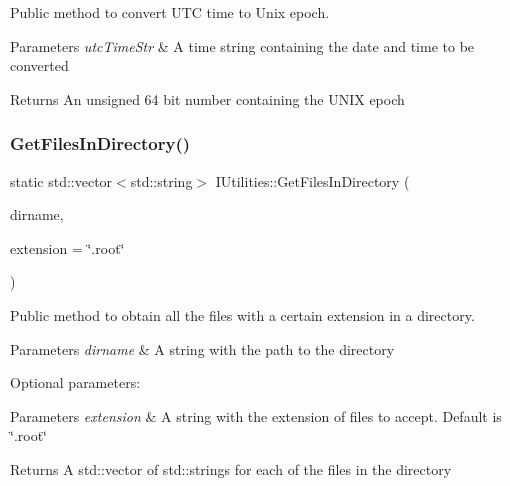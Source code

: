 Public method to convert U\+TC time to Unix epoch. 


\begin{DoxyParams}{Parameters}
{\em utc\+Time\+Str} & A time string containing the date and time to be converted\\
\hline
\end{DoxyParams}
\begin{DoxyReturn}{Returns}
An unsigned 64 bit number containing the U\+N\+IX epoch 
\end{DoxyReturn}
\mbox{\label{classIUtilities_affbe6e61c3f1c6169044273a7e1f83ba}} 
\subsubsection{\texorpdfstring{Get\+Files\+In\+Directory()}{GetFilesInDirectory()}}
{\footnotesize\ttfamily static std\+::vector$<$std\+::string$>$ I\+Utilities\+::\+Get\+Files\+In\+Directory (\begin{DoxyParamCaption}\item[{std\+::string}]{dirname,  }\item[{std\+::string}]{extension = {\ttfamily \char`\"{}.root\char`\"{}} }\end{DoxyParamCaption})\hspace{0.3cm}{\ttfamily [static]}}



Public method to obtain all the files with a certain extension in a directory. 


\begin{DoxyParams}{Parameters}
{\em dirname} & A string with the path to the directory\\
\hline
\end{DoxyParams}
Optional parameters\+: 
\begin{DoxyParams}{Parameters}
{\em extension} & A string with the extension of files to accept. Default is \char`\"{}.\+root\char`\"{}\\
\hline
\end{DoxyParams}
\begin{DoxyReturn}{Returns}
A std\+::vector of std\+::strings for each of the files in the directory 
\end{DoxyReturn}
\mbox{\label{classIUtilities_a722cad62278e16b2593a220a70c40d8e}} 
